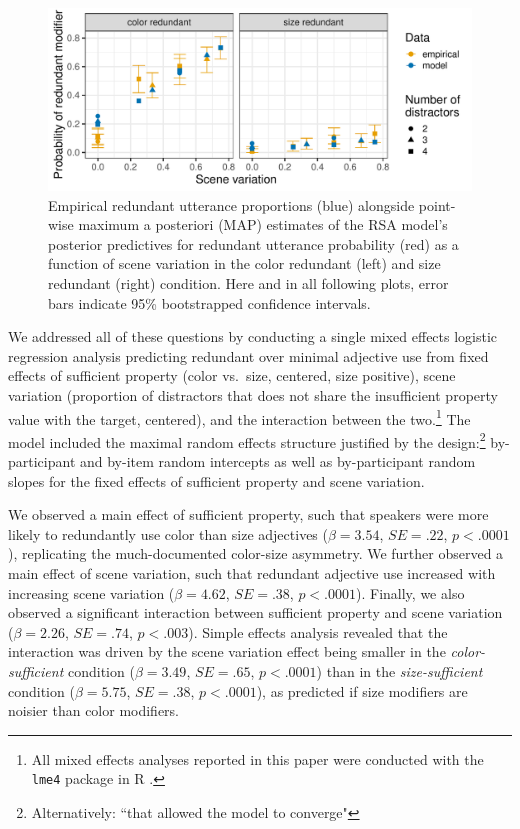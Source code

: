 \documentclass[11pt]{article}
\begin{document}
\begin{figure}[h]
\centering
\includegraphics[width=.8\textwidth]{images/exp1-empirical-predictives}
\caption{Empirical redundant utterance proportions  (blue)  alongside point-wise maximum a posteriori (MAP) estimates of the RSA model's posterior predictives for redundant utterance probability (red) as a function of scene variation in the color redundant (left) and size redundant (right) condition. Here and in all following plots, error bars indicate 95\% bootstrapped confidence intervals.}
\label{fig:exp1results}
\end{figure}

We addressed all of these questions by conducting a single mixed effects logistic regression analysis predicting redundant over minimal adjective use from fixed effects of sufficient property (color vs.~size, centered, size positive), scene variation (proportion of distractors that does not share the insufficient property value with the target, centered), and the interaction between the two.\footnote{All mixed effects analyses reported in this paper were conducted with the \texttt{lme4} package \cite{lme4} in R \cite{R}.} The model included the maximal random effects structure justified by the design:\footnote{Alternatively: ``that allowed the model to converge"} by-participant and by-item random intercepts as well as by-participant random slopes for the fixed effects of sufficient property and scene variation.

We observed a main effect of sufficient property, such that speakers were more likely to redundantly use color than size adjectives ($\beta = 3.54$, $SE = .22$, $p < .0001$), replicating the much-documented color-size asymmetry. We further observed a main effect of scene variation, such that redundant adjective use increased with increasing scene variation ($\beta = 4.62$, $SE = .38$, $p < .0001$). Finally, we also observed a significant interaction between sufficient property and scene variation ($\beta = 2.26$, $SE = .74$, $p < .003$). Simple effects analysis revealed that the interaction was driven by the scene variation effect being smaller in the \emph{color-sufficient} condition ($\beta = 3.49$, $SE = .65$, $p < .0001$) than in the \emph{size-sufficient} condition ($\beta = 5.75$, $SE = .38$, $p < .0001$), as predicted if size modifiers are noisier than color modifiers. 
\end{document}
